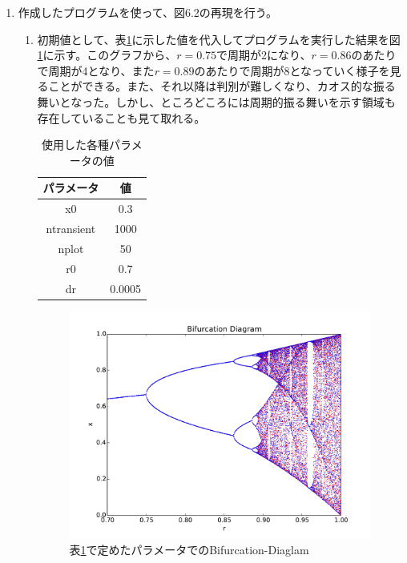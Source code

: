 \documentclass{jsarticle}
\begin{document}
\begin{enumerate}
 \renewcommand{\labelenumi}{\alph{enumi}.}
 \renewcommand{\labelenumii}{}

 \item 作成したプログラムを使って、図6.2の再現を行う。
 
  \begin{enumerate}
   \item 初期値として、表\ref{tab:t1}に示した値を代入してプログラムを実行した結果を図\ref{fig:f1}に示す。このグラフから、$r=0.75$で周期が2になり、$r=0.86$のあたりで周期が4となり、また$r=0.89$のあたりで周期が8となっていく様子を見ることができる。また、それ以降は判別が難しくなり、カオス的な振る舞いとなった。しかし、ところどころには周期的振る舞いを示す領域も存在していることも見て取れる。
   
   \begin{table}[htbp]
    \begin{center}
     \caption{使用した各種パラメータの値}
     \begin{tabular}{c|c} \hline
      パラメータ & 値  \\ \hline
      x0 & 0.3 \\
      ntransient & 1000 \\
      nplot & 50 \\
      r0 & 0.7 \\
      dr & 0.0005 \\
      \hline
     \end{tabular}
     \label{tab:t1}
    \end{center}
   \end{table}

   \begin{figure}[H]
    \begin{center}
     \includegraphics[width=17.0cm]{figure_1_2.pdf}
     \caption{表\ref{tab:t1}で定めたパラメータでのBifurcation-Diaglam}
     \label{fig:f1}
    \end{center}
   \end{figure}
  \end{enumerate}
\end{enumerate}
\end{document}
